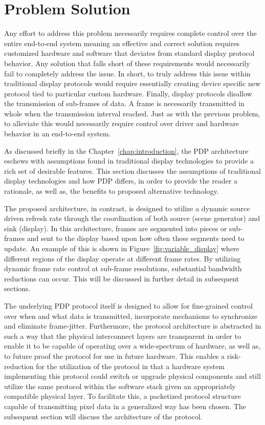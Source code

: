 \section{Problem Solution}
Any effort to address this problem necessarily requires complete control over the entire end-to-end system meaning an effective and correct solution requires customized hardware and software that deviates from standard display protocol behavior. Any solution that falls short of these requirements would necessarily fail to completely address the issue.
In short, to truly address this issue within traditional display protocols would require essentially creating device specific new protocol tied to particular custom hardware. Finally, display protocols disallow the transmission of sub-frames of data. A frame is necessarily transmitted in whole when the transmission interval reached. Just as with the previous problem, to alleviate this would necessarily require control over driver and hardware behavior in an end-to-end system.


As discussed briefly in the Chapter~\ref{chap:introduction}, the PDP architecture eschews with assumptions found in traditional display technologies to provide a rich set of desirable features. This section discusses the assumptions of traditional display technologies and how PDP differs, in order to provide the reader a rationale, as well as, the benefits to proposed alternative technology.

The proposed architecture, in contrast, is designed to utilize a dynamic source driven refresh rate through the coordination of both source (scene generator) and sink (display). In this architecture, frames are segmented into pieces or sub-frames and sent to the display based upon how often these segments need to update. An example of this is shown in Figure~\ref{fig:variable_display} where different regions of the display operate at different frame rates. By utilizing dynamic frame rate control at sub-frame resolutions, substantial bandwidth reductions can occur. This will be discussed in further detail in subsequent sections.

The underlying PDP protocol itself is designed to allow for fine-grained control over when and what data is transmitted, incorporate mechanisms to synchronize and eliminate frame-jitter. Furthermore, the protocol architecture is abstracted in such a way that the physical interconnect layers are transparent in order to enable it to be capable of operating over a wide-spectrum of hardware, as well as, to future proof the protocol for use in future hardware. This enables a risk-reduction for the utilization of the protocol in that a hardware system implementing this protocol could switch or upgrade physical components and still utilize the same protocol within the software stack given an appropriately compatible physical layer. To facilitate this, a packetized protocol structure capable of transmitting pixel data in a generalized way has been chosen. The subsequent section will discuss the architecture of the protocol.
